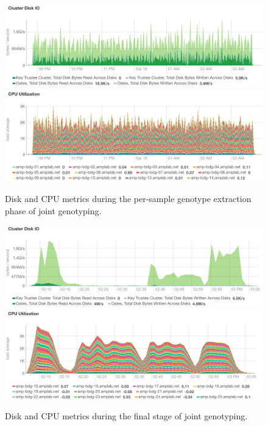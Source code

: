 \documentclass[phd]{ucbthesis}
\begin{document}
\begin{figure}[h]
  \begin{center}
    \includegraphics[width=0.95\linewidth]{graphs/extract-disk.png}
    \includegraphics[width=0.95\linewidth]{graphs/extract-cpu.png}
  \end{center}
  \caption{Disk and CPU metrics during the per-sample genotype extraction phase
    of joint genotyping.}
  \label{fig:extract-joint-genotyping}
\end{figure}

\begin{figure}[h]
  \begin{center}
    \includegraphics[width=0.95\linewidth]{graphs/jg-disk.png}
    \includegraphics[width=0.95\linewidth]{graphs/jg-cpu.png}
  \end{center}
  \caption{Disk and CPU metrics during the final stage of joint genotyping.}
  \label{fig:final-joint-genotyping}
\end{figure}
\end{document}
